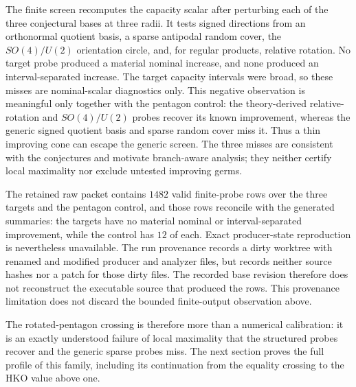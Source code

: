 The finite screen recomputes the capacity scalar after perturbing each of the
three conjectural bases at three radii.  It tests signed directions from an
orthonormal quotient basis, a sparse antipodal random cover, the
\(SO(4)/U(2)\) orientation circle, and, for regular products, relative
rotation.  No target probe produced a material nominal increase, and none
produced an interval-separated increase.  The target capacity intervals were
broad, so these misses are nominal-scalar diagnostics only.  This negative
observation is meaningful only together with the pentagon control:
the theory-derived relative-rotation and \(SO(4)/U(2)\) probes recover its
known improvement, whereas the generic signed quotient basis and sparse
random cover miss it.  Thus a thin improving cone can escape the generic
screen.  The three misses are consistent with the conjectures and motivate
branch-aware analysis; they neither certify local maximality nor exclude
untested improving germs.

The retained raw packet contains \(1482\) valid finite-probe rows over the
three targets and the pentagon control, and those rows reconcile with the
generated summaries: the targets have no material nominal or
interval-separated improvement, while the control has \(12\) of each.  Exact
producer-state reproduction is nevertheless unavailable.  The run provenance
records a dirty worktree with renamed and modified producer and analyzer files,
but records neither source hashes nor a patch for those dirty files.  The
recorded base revision therefore does not reconstruct the executable source
that produced the rows.  This provenance limitation does not discard the
bounded finite-output observation above.

The rotated-pentagon crossing is therefore more than a numerical calibration:
it is an exactly understood failure of local maximality that the structured
probes recover and the generic sparse probes miss.  The next section proves the
full profile of this family, including its continuation from the equality
crossing to the HKO value above one.
